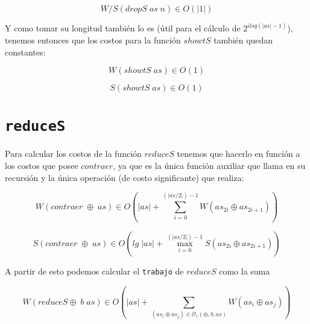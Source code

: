 \documentclass[a4paper,10pt]{article}
\begin{document}
\begin{equation*}
    W/S \left( dropS\; as\; n \right) \in 
    O \left( \vert 1 \vert \right)
\end{equation*}

\bigskip
   
    Y como tomar su longitud también lo es (útil para el cálculo de 
$2^{ilog(\vert as \vert -1)}$), tenemos entonces que los costos para la función
$showtS$ también quedan constantes:

\begin{equation*}
    W \left( showtS\; as \right) \in O \left( 1 \right)
\end{equation*}

\begin{equation*}
    S \left( showtS\; as \right) \in O \left( 1 \right)
\end{equation*}


\bigskip
    

\section*{\texttt{reduceS}}

    Para calcular los costos de la función $reduceS$ tenemos que hacerlo en función
a los costos que posee $contraer$, ya que es la única función auxiliar que llama en
su recursión y la única operación (de costo significante) que realiza:

\begin{equation*}
    W \left( contraer \;\oplus \;as \right) \in
    O \left( \vert as \vert + \sum_{i=0}^{(\vert as / 2 \vert) - 1} W \left( as_{2i} \oplus as_{2i+1} \right) \right)
\end{equation*}

\begin{equation*}
    S \left( contraer \;\oplus \;as \right) \in
    O \left( lg \; \vert as \vert + \max_{i=0}^{(\vert as / 2 \vert) - 1} S \left( as_{2i} \oplus as_{2i+1} \right) \right)
\end{equation*}

\bigskip

    A partir de esto podemos calcular el \texttt{trabajo} de $reduceS$ como la suma


\begin{equation*}
    W \left( reduceS \oplus \; b \; as \right) \in
    O \left( \vert as \vert + \sum_{(as_i \oplus as_j) \in \mathcal{O}_r(\oplus,b,as)} W \left( as_i \oplus as_j \right) \right)
\end{equation*}
\end{document}
